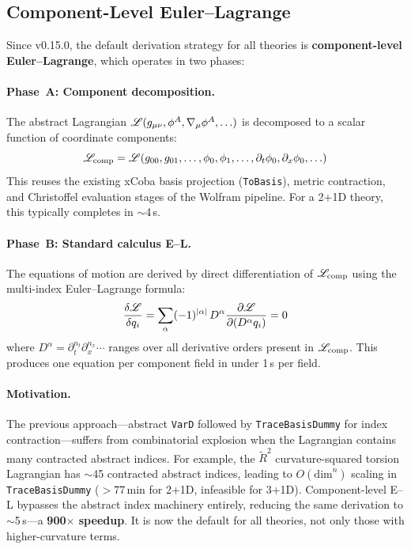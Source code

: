 \subsection{Component-Level Euler--Lagrange}
\label{sec:component-el}

Since v0.15.0, the default derivation strategy for all theories is \textbf{component-level Euler--Lagrange}, which operates in two phases:

\paragraph{Phase~A: Component decomposition.}
The abstract Lagrangian $\mathscr{L}(g_{\mu\nu}, \phi^A, \nabla_\mu \phi^A, \ldots)$ is decomposed to a scalar function of coordinate components:
\begin{equation}
  \mathscr{L}_{\text{comp}} = \mathscr{L}(g_{00}, g_{01}, \ldots, \phi_0, \phi_1, \ldots, \partial_t \phi_0, \partial_x \phi_0, \ldots)
\end{equation}
This reuses the existing xCoba basis projection (\texttt{ToBasis}), metric contraction, and Christoffel evaluation stages of the Wolfram pipeline. For a 2+1D theory, this typically completes in $\sim$4\,s.

\paragraph{Phase~B: Standard calculus E--L.}
The equations of motion are derived by direct differentiation of $\mathscr{L}_{\text{comp}}$ using the multi-index Euler--Lagrange formula:
\begin{equation}
  \frac{\delta \mathscr{L}}{\delta q_i} = \sum_{\alpha} (-1)^{|\alpha|}\, D^\alpha \frac{\partial \mathscr{L}}{\partial (D^\alpha q_i)} = 0
  \label{eq:component-el}
\end{equation}
where $D^\alpha = \partial_t^{n_t} \partial_x^{n_x} \cdots$ ranges over all derivative orders present in $\mathscr{L}_{\text{comp}}$. This produces one equation per component field in under 1\,s per field.

\paragraph{Motivation.}
The previous approach---abstract \texttt{VarD} followed by \texttt{TraceBasisDummy} for index contraction---suffers from combinatorial explosion when the Lagrangian contains many contracted abstract indices. For example, the $\tilde{R}^2$ curvature-squared torsion Lagrangian has $\sim$45 contracted abstract indices, leading to $O(\text{dim}^{n})$ scaling in \texttt{TraceBasisDummy} ($>$77\,min for 2+1D, infeasible for 3+1D). Component-level E--L bypasses the abstract index machinery entirely, reducing the same derivation to $\sim$5\,s---a \textbf{900$\times$ speedup}. It is now the default for all theories, not only those with higher-curvature terms.

